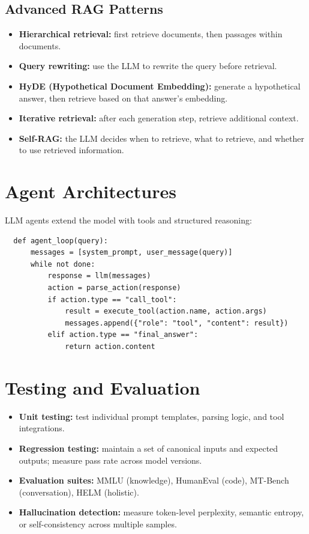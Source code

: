 \documentclass[11pt,a4paper]{book}
\theoremstyle{definition}
\begin{document}
\subsection{Advanced RAG Patterns}

\begin{itemize}
	\item \textbf{Hierarchical retrieval:} first retrieve documents, then passages within documents.
	\item \textbf{Query rewriting:} use the LLM to rewrite the query before retrieval.
	\item \textbf{HyDE (Hypothetical Document Embedding):} generate a hypothetical answer, then retrieve based on that answer's embedding.
	\item \textbf{Iterative retrieval:} after each generation step, retrieve additional context.
	\item \textbf{Self-RAG:} the LLM decides when to retrieve, what to retrieve, and whether to use retrieved information.
\end{itemize}

\section{Agent Architectures}

LLM agents extend the model with tools and structured reasoning:
\begin{lstlisting}
  def agent_loop(query):
      messages = [system_prompt, user_message(query)]
      while not done:
          response = llm(messages)
          action = parse_action(response)
          if action.type == "call_tool":
              result = execute_tool(action.name, action.args)
              messages.append({"role": "tool", "content": result})
          elif action.type == "final_answer":
              return action.content
\end{lstlisting}

\section{Testing and Evaluation}

\begin{itemize}
	\item \textbf{Unit testing:} test individual prompt templates, parsing logic, and tool integrations.
	\item \textbf{Regression testing:} maintain a set of canonical inputs and expected outputs; measure pass rate across model versions.
	\item \textbf{Evaluation suites:} MMLU (knowledge), HumanEval (code), MT-Bench (conversation), HELM (holistic).
	\item \textbf{Hallucination detection:} measure token-level perplexity, semantic entropy, or self-consistency across multiple samples.
\end{itemize}
\end{document}
